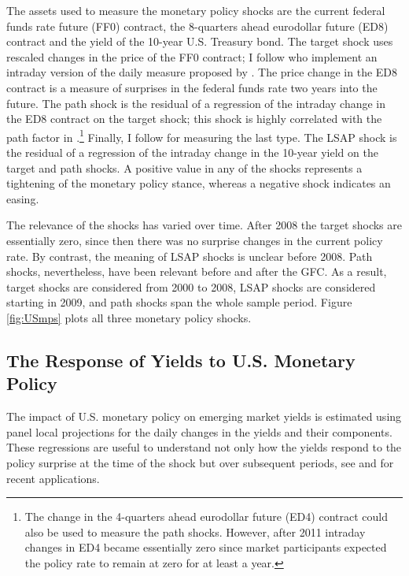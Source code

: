 {The assets used to measure the monetary policy shocks are the current federal funds rate future (FF0) contract, the 8-quarters ahead eurodollar future (ED8) contract and the yield of the 10-year U.S. Treasury bond.
The target shock uses rescaled changes in the price of the FF0 contract; I follow \cite{GSS:2005a} who implement an intraday version of the daily measure proposed by \cite{Kuttner:2001}.
The price change in the ED8 contract is a measure of surprises in the federal funds rate two years into the future.
The path shock is the residual of a regression of the intraday change in the ED8 contract on the target shock; this shock is highly correlated with the path factor in \cite{GSS:2005a}.\footnote{ The change in the 4-quarters ahead eurodollar future (ED4) contract could also be used to measure the path shocks. However, after 2011 intraday changes in ED4 became essentially zero since market participants expected the policy rate to remain at zero for at least a year.}
Finally, I follow \cite{Swanson:2018} for measuring the last type. %
The LSAP shock is the residual of a regression of the intraday change in the 10-year yield on the target and path shocks.
A positive value in any of the shocks represents a tightening of the monetary policy stance, whereas a negative shock indicates an easing.


The relevance of the shocks has varied over time.
After 2008 the target shocks are essentially zero, since then there was no surprise changes in the current policy rate.
By contrast, the meaning of LSAP shocks is unclear before 2008.
Path shocks, nevertheless, have been relevant before and after the GFC.
As a result, target shocks are considered from 2000 to 2008, LSAP shocks are considered starting in 2009, and path shocks span the whole sample period.
Figure \ref{fig:USmps} plots all three monetary policy shocks.


\subsection{The Response of Yields to U.S. Monetary Policy} \label{sec:LPs}
\iftoggle{toclinks}{\gototoc}{} %

The impact of U.S. monetary policy on emerging market yields is estimated using panel local projections for the daily changes in the yields and their components.
These regressions are useful to understand not only how the yields respond to the policy surprise at the time of the shock but over subsequent periods, see \cite{HofmannShimShin:2019} and \cite{ACDM:2019} for recent applications.

}
